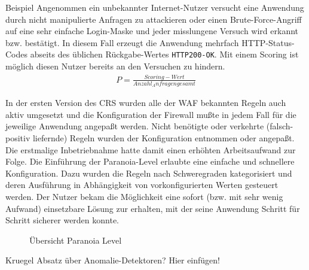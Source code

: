 \textcolor{bhtGray}{ Beispiel} Angenommen ein unbekannter Internet-Nutzer versucht eine Anwendung durch nicht manipulierte Anfragen zu attackieren oder einen Brute-Force-Angriff auf eine sehr einfache Login-Maske und jeder misslungene Versuch wird erkannt bzw. bestätigt. In diesem Fall erzeugt die Anwendung mehrfach HTTP-Status-Codes abseits des üblichen Rückgabe-Wertes \verb=HTTP200-OK=. Mit einem Scoring ist möglich diesen Nutzer bereits an den Versuchen zu hindern.
\begin{align}
  P = \frac{Scoring-Wert}{Anzahl_Anfragen gesamt}
\end{align}

In der ersten Version des CRS wurden alle der WAF bekannten Regeln auch aktiv umgesetzt und die Konfiguration der Firewall mußte in jedem Fall für die jeweilige Anwendung angepaßt werden. Nicht benötigte oder verkehrte (falsch-positiv liefernde) Regeln wurden der Konfiguration entnommen oder angepaßt. Die erstmalige Inbetriebnahme hatte damit einen erhöhten Arbeitsaufwand zur Folge. Die Einführung der Paranoia-Level erlaubte eine einfache und schnellere Konfiguration. Dazu wurden die Regeln nach Schweregraden kategorisiert und deren Ausführung in Abhängigkeit von vorkonfigurierten Werten gesteuert werden. Der Nutzer bekam die Möglichkeit eine sofort (bzw. mit sehr wenig Aufwand) einsetzbare Lösung zur erhalten, mit der seine Anwendung Schritt für Schritt sicherer werden konnte.

\begin{figure}[ht]
  \centering
  
  \caption{Übersicht Paranoia Level~\cite{owaspcrs}}
  \label{fig.paranoia}
\end{figure}



\begin{neu}
  Kruegel Absatz über Anomalie-Detektoren? Hier einfügen!
\end{neu}

